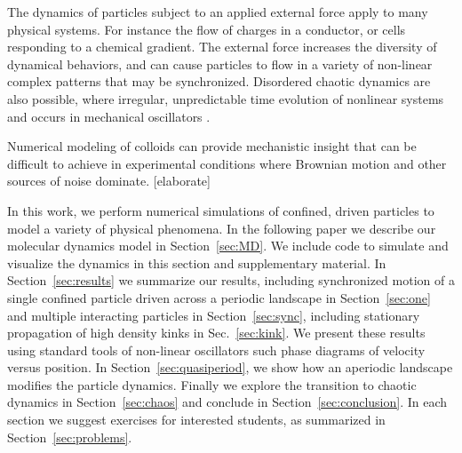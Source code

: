 \documentclass[twocolumn,preprintnumbers,amsmath,amssymb,aps,prx]{revtex4}
\begin{document}
The
dynamics of particles subject to 
an applied external force apply to many physical systems.
For instance the flow of charges in a conductor,
or cells responding to a chemical gradient.
The external force 
increases the diversity of dynamical behaviors,
and can cause particles to flow in
a variety of non-linear complex patterns
that may be 
synchronized.
Disordered chaotic dynamics are also possible,
where irregular, unpredictable time evolution of
nonlinear systems and occurs in mechanical oscillators \cite{chaos}.


Numerical modeling of colloids can provide mechanistic insight
that can be difficult to achieve in experimental conditions
where Brownian motion and other sources of noise dominate.
[elaborate]




In this work,
we perform 
numerical simulations of confined, driven particles
to model a variety of physical phenomena.
In the following paper we describe
our molecular dynamics model in Section~\ref{sec:MD}.
We include code to simulate
and visualize the dynamics in this section
and supplementary material.
In Section~\ref{sec:results} we summarize
our results,
including synchronized motion of a single confined particle
driven across a periodic landscape in 
Section~\ref{sec:one} and
multiple interacting particles
in Section~\ref{sec:sync},
including stationary propagation of high density kinks
in Sec.~\ref{sec:kink}.
We present these results using standard tools of non-linear oscillators
such phase diagrams of velocity versus position.
In Section~\ref{sec:quasiperiod},
we show how an aperiodic landscape modifies the particle dynamics.
Finally we explore the transition to chaotic dynamics in 
Section~\ref{sec:chaos}
and conclude 
in Section~\ref{sec:conclusion}. 
In each section
we suggest exercises for interested students,
as summarized in Section~\ref{sec:problems}.
\end{document}
